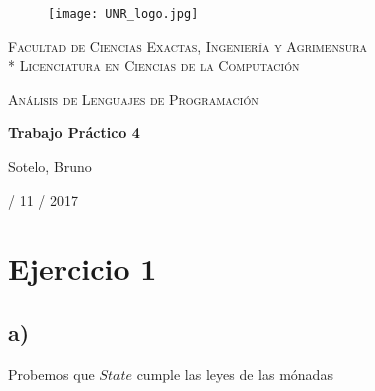 \documentclass[a4paper]{report}
\begin{document}
\begin{titlepage}
\centering
\begin{figure}[H]
    \begin{center}
        \texttt{[image: UNR\_logo.jpg]}
    \end{center}
\end{figure}
{\scshape\large Facultad de Ciencias Exactas, Ingenier\'ia y Agrimensura\\*
                 Licenciatura en Ciencias de la Computaci\'on\par}
\vspace{3cm}
{\scshape\LARGE An\'alisis de Lenguajes de Programaci\'on \par}
{\huge\bfseries Trabajo Pr\'actico 4 \par}
\vspace{3cm}
{\Large Sotelo, Bruno\par}
\vfill
{\large  / 11 / 2017 \par}
\end{titlepage}

\section*{Ejercicio 1}
\subsection*{a)}
Probemos que $State$ cumple las leyes de las m\'onadas
\end{document}
